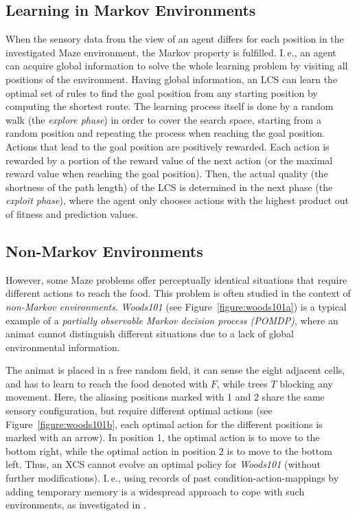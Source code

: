 \subsection{Learning in Markov Environments} %
\label{subsection:learning-markov}

When the sensory data from the view of an agent differs for each position in the investigated Maze environment, the Markov property is fulfilled. I.\,e., an agent can acquire global information to solve the whole learning problem by visiting all positions of the environment. Having global information, an LCS can learn the optimal set of rules to find the goal position from any starting position by computing the shortest route. The learning process itself is done by a random walk (the \emph{explore phase}) in order to cover the search space, starting from a random position and repeating the process when reaching the goal position. Actions that lead to the goal position are positively rewarded. Each action is rewarded by a portion of the reward value of the next action (or the maximal reward value when reaching the goal position). Then, the actual quality (the shortness of the path length) of the LCS is determined in the next phase (the \emph{exploit phase}), where the agent only chooses actions with the highest product out of fitness and prediction values.

\subsection{Non-Markov Environments}
\label{subsection:non-markov-environments}

However, some Maze problems offer perceptually identical situations that require different actions to reach the food. This problem is often studied in the context of \emph{non-Markov environments}. \emph{Woods101} (see Figure~\ref{figure:woods101a}) is a typical example of a \emph{partially observable Markov decision process (POMDP)}, where an animat cannot distinguish different situations due to a lack of global environmental information. 

The animat is placed in a free random field, it can sense the eight adjacent cells, and has to learn to reach the food denoted with $F$, while trees $T$ blocking any movement. Here, the aliasing positions marked with 1 and 2 share the same sensory configuration, but require different optimal actions (see Figure~\ref{figure:woods101b}, each optimal action for the different positions is marked with an arrow). In position 1, the optimal action is to move to the bottom right, while the optimal action in position 2 is to move to the bottom left. Thus, an XCS cannot evolve an optimal policy for \emph{Woods101} (without further modifications). I.\,e., using records of past condition-action-mappings by adding temporary memory is a widespread approach to cope with such environments, as investigated in \cite{Lan98,LW00}.

